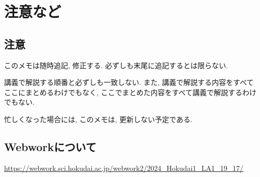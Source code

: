 \chapter{注意など}
\section{注意}
このメモは随時追記, 修正する.
必ずしも末尾に追記するとは限らない.

講義で解説する順番と必ずしも一致しない.
また, 講義で解説する内容をすべてここにまとめるわけでもなく,
ここでまとめた内容をすべて講義で解説するわけでもない.

忙しくなった場合には,
このメモは,
更新しない予定である.


\section{Webworkについて}
\url{https://webwork.sci.hokudai.ac.jp/webwork2/2024_Hokudai1_LA1_19_17/}
